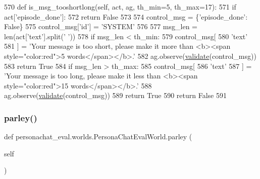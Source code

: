 \begin{DoxyCode}
570     \textcolor{keyword}{def }is\_msg\_tooshortlong(self, act, ag, th\_min=5, th\_max=17):
571         \textcolor{keywordflow}{if} act[\textcolor{stringliteral}{'episode\_done'}]:
572             \textcolor{keywordflow}{return} \textcolor{keyword}{False}
573 
574         control\_msg = \{\textcolor{stringliteral}{'episode\_done'}: \textcolor{keyword}{False}\}
575         control\_msg[\textcolor{stringliteral}{'id'}] = \textcolor{stringliteral}{'SYSTEM'}
576 
577         msg\_len = len(act[\textcolor{stringliteral}{'text'}].split(\textcolor{stringliteral}{' '}))
578         \textcolor{keywordflow}{if} msg\_len < th\_min:
579             control\_msg[
580                 \textcolor{stringliteral}{'text'}
581             ] = \textcolor{stringliteral}{'Your message is too short, please make it more than <b><span style="color:red">5
       words</span></b>.'}
582             ag.observe(\hyperlink{namespaceparlai_1_1core_1_1worlds_afc3fad603b7bce41dbdc9cdc04a9c794}{validate}(control\_msg))
583             \textcolor{keywordflow}{return} \textcolor{keyword}{True}
584         \textcolor{keywordflow}{if} msg\_len > th\_max:
585             control\_msg[
586                 \textcolor{stringliteral}{'text'}
587             ] = \textcolor{stringliteral}{'Your message is too long, please make it less than <b><span style="color:red">15
       words</span></b>.'}
588             ag.observe(\hyperlink{namespaceparlai_1_1core_1_1worlds_afc3fad603b7bce41dbdc9cdc04a9c794}{validate}(control\_msg))
589             \textcolor{keywordflow}{return} \textcolor{keyword}{True}
590         \textcolor{keywordflow}{return} \textcolor{keyword}{False}
591 
\end{DoxyCode}
\mbox{\label{classpersonachat__eval_1_1worlds_1_1PersonaChatEvalWorld_ac004d69692fbc9b4f0c1c88525de052a}} 
\subsubsection{\texorpdfstring{parley()}{parley()}}
{\footnotesize\ttfamily def personachat\+\_\+eval.\+worlds.\+Persona\+Chat\+Eval\+World.\+parley (\begin{DoxyParamCaption}\item[{}]{self }\end{DoxyParamCaption})}



